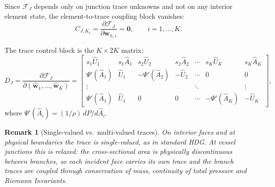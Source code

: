 \documentclass[11pt]{article}
\newtheorem{remark}[theorem]{Remark}
\begin{document}
Since $\mathcal{F}_J$ depends only on junction trace unknowns
and not on any interior element state, the element-to-trace
coupling block vanishes:
\begin{equation}
C_{J,K_i}
=
\frac{\partial\mathcal{F}_J}{\partial\mathbf{w}_{h,i}}
=
\mathbf{0},
\qquad i=1,\ldots,K.
\label{eq:Cjunc}
\end{equation}

The trace control block is the $K\times 2K$ matrix:
\begin{equation}
D_J
=
\frac{\partial\mathcal{F}_J}
     {\partial(\widehat{\mathbf{w}}_1,\ldots,\widehat{\mathbf{w}}_K)}
=
\begin{bmatrix}
s_1\widehat{U}_1 & s_1\widehat{A}_1 &
s_2\widehat{U}_2 & s_2\widehat{A}_2 &
\cdots &
s_K\widehat{U}_K & s_K\widehat{A}_K
\\[8pt]
\Psi'(\widehat{A}_1) & \widehat{U}_1 &
-\Psi'(\widehat{A}_2) & -\widehat{U}_2 &
\cdots & 0 & 0
\\[4pt]
\vdots & & & & \ddots & & \vdots
\\[4pt]
\Psi'(\widehat{A}_1) & \widehat{U}_1 &
0 & 0 & \cdots &
-\Psi'(\widehat{A}_K) & -\widehat{U}_K
\end{bmatrix},
\label{eq:DJ}
\end{equation}
where $\Psi'(\widehat{A}_i) = (1/\rho)\,dP/d\widehat{A}_i$.
\begin{remark}[Single-valued vs.\ multi-valued traces]
On interior faces and at physical boundaries the trace is single-valued, as in
standard HDG. At vessel junctions
this is relaxed: the cross-sectional area is physically discontinuous between
branches, so each incident face carries its own trace and the branch traces are
coupled through conservation of mass, continuity of total pressure and Riemann Invariants.
\end{remark}
\end{document}
